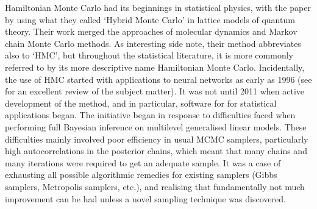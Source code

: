 Hamiltonian Monte Carlo had its beginnings in statistical physics, with the \citeyear{duane1987hybrid} paper by \citeauthor{duane1987hybrid} using what they called `Hybrid Monte Carlo' in lattice models of quantum theory.
Their work merged the approaches of molecular dynamics and Markov chain Monte Carlo methods.
As interesting side note, their method abbreviates also to `HMC', but throughout the statistical literature, it is more commonly referred to by its more descriptive name Hamiltonian Monte Carlo.
Incidentally, the use of HMC started with applications to neural networks as early as 1996 (see \citet{neal2011mcmc} for an excellent review of the subject matter).
It was not until 2011 when active development of the method, and in particular, software for for statistical applications began.
The  initiative \citep{carpenter2016stan} began in response to difficulties faced when performing full Bayesian inference on multilevel generalised linear models.
These difficulties mainly involved poor efficiency in usual MCMC samplers, particularly high autocorrelations in the posterior chains, which meant that many chains and many iterations were required to get an adequate sample.
It was a case of exhausting all possible algorithmic remedies for existing samplers (Gibbs samplers, Metropolis samplers, etc.), and realising that fundamentally not much improvement can be had unless a novel sampling technique was discovered.

